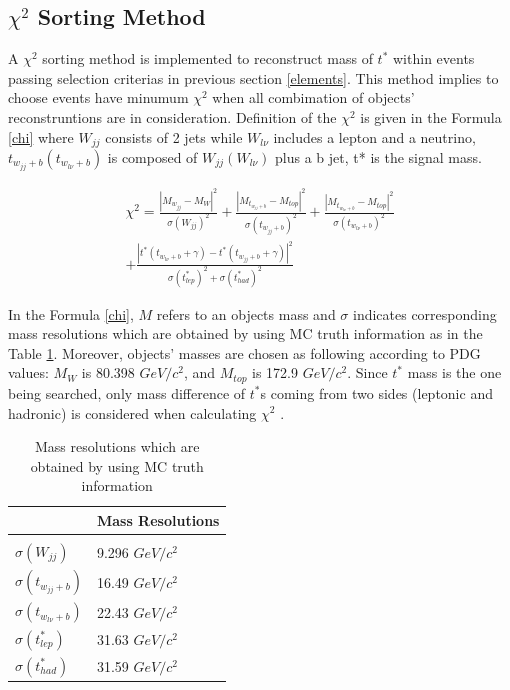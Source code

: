 \documentclass[12pt,oneandhalf,chaparabic,phys,ms,eng]{metu}
\begin{document}
\subsection{$\chi^2$ Sorting Method}
A $\chi^2$ sorting method is implemented  to reconstruct mass of $t^*$ within events passing selection criterias in previous section \ref{elements}. This method implies to choose events have minumum $\chi^2$ when all combimation of objects' reconstruntions are in consideration. Definition of  the $\chi^2$  is given in the Formula \ref{chi} where $W_{jj}$ consists of 2 jets while $W_{l\nu}$ includes a lepton and a neutrino, ${t_{w_{jj}+b}}({t_{w_{l\nu}+b}})$ is composed of $W_{jj}(W_{l\nu})$ plus a b jet, t* is the signal mass. 

\begin{eqnarray}
\label{chi}
	{\chi}^2 = \frac{|M_{w_{jj}} - M_W|^2}{\sigma (W_{jj})^2} + \frac{|M_{t_{w_{jj}+b}} - M_{top}|^2}{\sigma ({t_{w_{jj}+b}})^2} 
+ \frac{|M_{t_{w_{l\nu}+b}} - M_{top}|^2}{\sigma ({t_{w_{l\nu}+b}})^2} \nonumber \\
+\frac{|t^*(t_{w_{l\nu}+b}+\gamma)-t^*(t_{w_{jj}+b}+\gamma)|^2}{\sigma(t^*_{lep})^2 + \sigma(t^*_{had})^2}
\end{eqnarray}

In the Formula \ref{chi}, $M$ refers to an objects mass and $\sigma$ indicates corresponding mass resolutions which are obtained by using MC truth information as in the Table \ref{massres}. Moreover, objects' masses are chosen as following according to PDG values: $M_W$ is 80.398 $GeV/ c^2$, and $M_{top}$ is 172.9 $GeV/ c^2$. Since $t^*$  mass is the one being searched, only mass difference of $t^*$s coming from two sides (leptonic and hadronic) is considered when calculating ${\chi}^2$ . 

\begin{table}[!hbt]
\caption{Mass resolutions which are obtained by using MC truth information}
\label{massres}
\begin{center}
\begin{tabular}{l | l} %
		 & Mass Resolutions \\ \hline
\\
 $\sigma(W_{jj})$    & 9.296 $GeV/c^2$  \\ %
$\sigma ({t_{w_{jj}+b}})$ & 16.49 $GeV/c^2$ \\
$\sigma ({t_{w_{l\nu}+b}})$ & 22.43 $GeV/c^2$ \\
$\sigma(t^*_{lep}) $ & 31.63 $GeV/c^2$ \\
$\sigma(t^*_{had}) $ & 31.59 $GeV/c^2$ \\
\end{tabular}
\end{center}
\end{table}
\end{document}
